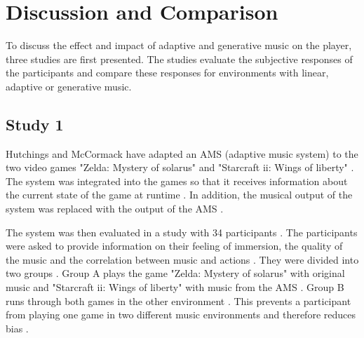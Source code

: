 \section{Discussion and Comparison}

To discuss the effect and impact of adaptive and generative music on the player, three studies are first presented. The studies evaluate the subjective responses of the participants and compare these responses for environments with linear, adaptive or generative music.

\subsection{Study 1}
Hutchings and McCormack have adapted an AMS (adaptive music system) to the two video games "Zelda: Mystery of solarus" \cite{zeldamysteryofsolarus2011}  and "Starcraft ii: Wings of liberty" \cite{starcraftiiwingsofliberty} \cite{hutMcCormAms}. The system was integrated into the games so that it receives information about the current state of the game at runtime \cite{hutMcCormAms}. In addition, the musical output of the system was replaced with the output of the AMS \cite{hutMcCormAms}. 

The system was then evaluated in a study with 34 participants \cite{hutMcCormAms}. The participants were asked to provide information on their feeling of immersion, the quality of the music and the correlation between music and actions \cite{hutMcCormAms}. They were divided into two groups \cite{hutMcCormAms}. Group A plays the game "Zelda: Mystery of solarus" with original music and "Starcraft ii: Wings of liberty" with music from the AMS \cite{hutMcCormAms}. Group B runs through both games in the other environment \cite{hutMcCormAms}. This prevents a participant from playing one game in two different music environments and therefore reduces bias \cite{hutMcCormAms}.

